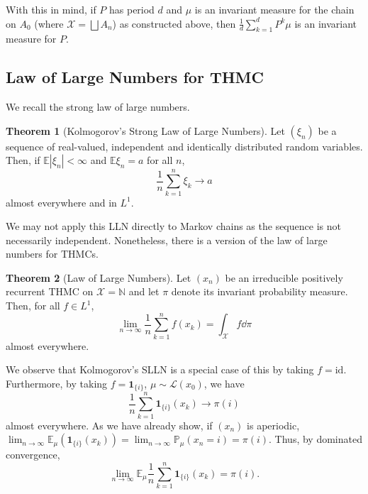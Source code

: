 \documentclass[]{article}
\theoremstyle{definition}
\newtheorem{theorem}{Theorem}
\theoremstyle{definition}
\begin{document}
With this in mind, if \(P\) has period \(d\) and \(\mu\) is an invariant 
measure for the chain on \(A_0\) (where \(\mathcal{X} = \bigsqcup A_n\)) as 
constructed above, then \(\frac{1}{d}\sum_{k = 1}^d P^k \mu\) is an 
invariant measure for \(P\).

\subsection{Law of Large Numbers for THMC}

We recall the strong law of large numbers.

\begin{theorem}[Kolmogorov's Strong Law of Large Numbers]
  Let \((\xi_n)\) be a sequence of real-valued, independent and identically 
  distributed random variables. Then, if \(\mathbb{E}|\xi_n| < \infty\) and 
  \(\mathbb{E}\xi_n = a\) for all \(n\), 
  \[\frac{1}{n} \sum_{k = 1}^n \xi_k \to a\]
  almost everywhere and in \(L^1\).
\end{theorem}

We may not apply this LLN directly to Markov chains as the sequence is not 
necessarily independent. Nonetheless, there is a version of the law of large 
numbers for THMCs.

\begin{theorem}[Law of Large Numbers]
  Let \((x_n)\) be an irreducible positively recurrent THMC on 
  \(\mathcal{X} = \mathbb{N}\) and let \(\pi\) denote its invariant probability 
  measure. Then, for all \(f \in L^1\), 
  \[\lim_{n \to \infty} \frac{1}{n}\sum_{k = 1}^n f(x_k) = 
    \int_{\mathcal{X}} f \dd \pi\]
  almost everywhere.
\end{theorem}

We observe that Kolmogorov's SLLN is a special case of this by taking 
\(f = \text{id}\). Furthermore, by taking 
\(f = \mathbf{1}_{\{i\}}\), \(\mu \sim \mathcal{L}(x_0)\), we have 
\[\frac{1}{n}\sum_{k = 1}^n \mathbf{1}_{\{i\}}(x_k) \to \pi(i)\]
almost everywhere. As we have already show, if \((x_n)\) is aperiodic, 
\(\lim_{n \to \infty} \mathbb{E}_\mu(\mathbf{1}_{\{i\}}(x_k)) = 
\lim_{n \to \infty}\mathbb{P}_\mu(x_n = i) = \pi(i)\). Thus, by 
dominated convergence, 
\[\lim_{n \to \infty}\mathbb{E}_\mu \frac{1}{n}\sum_{k = 1}^n \mathbf{1}_{\{i\}}(x_k)
  = \pi(i).\]
\end{document}

